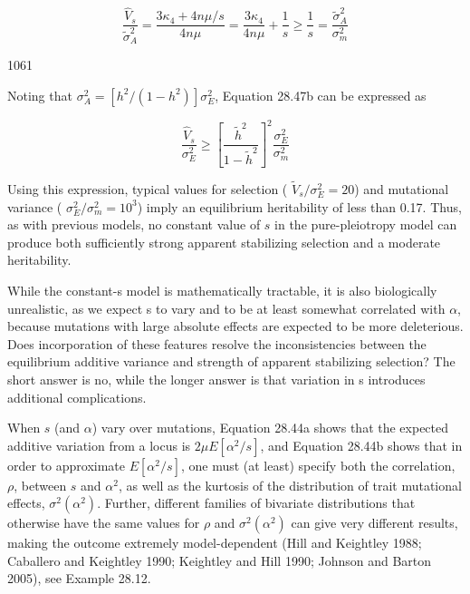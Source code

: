 \documentclass{article}
\begin{document}
\begin{equation}
\frac{\widehat{V}_{s}}{\widetilde{\sigma}_{A}^{2}}=\frac{3\kappa_{4}+4n\mu/s}{4n\mu}=\frac{3\kappa_{4}}{4n\mu}+\frac{1}{s}\geq\frac{1}{s}=\frac{\widetilde{\sigma}_{A}^{2}}{\sigma_{m}^{2}}
\tag{28.47b}
\label{eq:28_47b}
\end{equation}

1061

Noting that  $ \sigma_A^2 = [h^2 / (1 - h^2)] \sigma_E^2 $, Equation 28.47b can be expressed as

\begin{equation}
\frac{\widehat{V}_{s}}{\sigma_{E}^{2}}\geq\left[\frac{\widetilde{h}^{2}}{1-\widetilde{h}^{2}}\right]^{2}\frac{\sigma_{E}^{2}}{\sigma_{m}^{2}}
\tag{28.47c}
\label{eq:28_47c}
\end{equation}

Using this expression, typical values for selection ( $ \tilde{V}_s/\sigma_E^2 = 20 $) and mutational variance ( $ \sigma_E^2/\sigma_m^2 = 10^3 $) imply an equilibrium heritability of less than 0.17. Thus, as with previous models, no constant value of  $ s $ in the pure-pleiotropy model can produce both sufficiently strong apparent stabilizing selection and a moderate heritability.

While the constant-s model is mathematically tractable, it is also biologically unrealistic, as we expect s to vary and to be at least somewhat correlated with  $ \alpha $, because mutations with large absolute effects are expected to be more deleterious. Does incorporation of these features resolve the inconsistencies between the equilibrium additive variance and strength of apparent stabilizing selection? The short answer is no, while the longer answer is that variation in s introduces additional complications.

When  $ s $ (and  $ \alpha $) vary over mutations, Equation 28.44a shows that the expected additive variation from a locus is  $ 2\mu E[\alpha^2/s] $, and Equation 28.44b shows that in order to approximate  $ E[\alpha^2/s] $, one must (at least) specify both the correlation,  $ \rho $, between  $ s $ and  $ \alpha^2 $, as well as the kurtosis of the distribution of trait mutational effects,  $ \sigma^2(\alpha^2) $. Further, different families of bivariate distributions that otherwise have the same values for  $ \rho $ and  $ \sigma^2(\alpha^2) $ can give very different results, making the outcome extremely model-dependent (Hill and Keightley 1988; Caballero and Keightley 1990; Keightley and Hill 1990; Johnson and Barton 2005), see Example 28.12.
\end{document}
